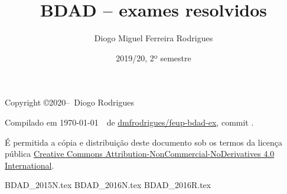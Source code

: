 \documentclass{bdad}
\title{BDAD -- exames resolvidos}
\author{Diogo Miguel Ferreira Rodrigues  \\ \email{dmfrodrigues2000@gmail.com}}
\date{2019/20, 2º semestre}
\begin{document}
\maketitle
\begin{secondpage}
    Copyright \copyright 2020--\the\year\ Diogo Rodrigues\par
    \par
    \immediate{}
    Compilado em \today~\currenttime~de \href{https://github.com/dmfrodrigues/feup-bdad-ex}{dmfrodrigues/feup-bdad-ex}, commit \unskip.\par
    É permitida a cópia e distribuição deste documento sob os termos da licença pública
    \href{https://creativecommons.org/licenses/by-nc-nd/4.0/}{Creative Commons Attribution-NonCommercial-NoDerivatives 4.0 International}.
\end{secondpage}
\frontmatter
\tableofcontents
\mainmatter
{BDAD_2015N.tex}
{BDAD_2016N.tex}
{BDAD_2016R.tex}
\end{document}

